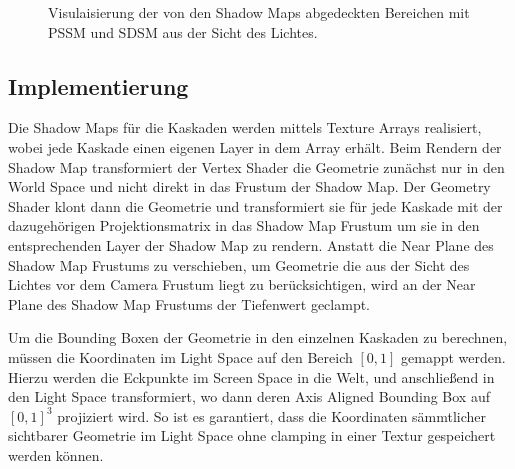 \documentclass[runningheaders,a4paper]{llncs}
\begin{document}
\begin{figure}
	\centering

	\caption{Visulaisierung der von den Shadow Maps abgedeckten Bereichen mit PSSM und SDSM aus der Sicht des Lichtes.}
\end{figure}



\subsection{Implementierung}

Die Shadow Maps für die Kaskaden werden mittels Texture Arrays realisiert, wobei jede Kaskade einen eigenen Layer in dem Array erhält.
Beim Rendern der Shadow Map transformiert der Vertex Shader die Geometrie zunächst nur in den World Space und nicht direkt in das Frustum der Shadow Map.
Der Geometry Shader klont dann die Geometrie und transformiert sie für jede Kaskade mit der dazugehörigen Projektionsmatrix in das Shadow Map Frustum um sie in den entsprechenden Layer der Shadow Map zu rendern.
Anstatt die Near Plane des Shadow Map Frustums zu verschieben, um Geometrie die aus der Sicht des Lichtes vor dem Camera Frustum liegt zu berücksichtigen, wird an der Near Plane des Shadow Map Frustums der Tiefenwert geclampt.

Um die Bounding Boxen der Geometrie in den einzelnen Kaskaden zu berechnen, müssen die Koordinaten im Light Space auf den Bereich $[0, 1]$ gemappt werden.
Hierzu werden die Eckpunkte im Screen Space in die Welt, und anschließend in den Light Space transformiert, wo dann deren Axis Aligned Bounding Box auf $[0, 1]^3$ projiziert wird.
So ist es garantiert, dass die Koordinaten sämmtlicher sichtbarer Geometrie im Light Space ohne clamping in einer Textur gespeichert werden können.
\end{document}
